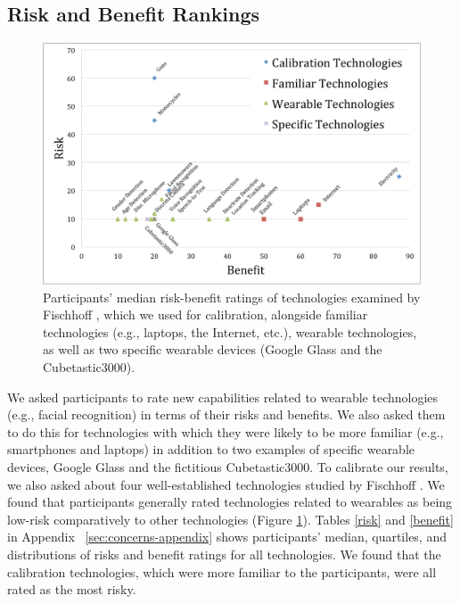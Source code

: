 
\subsection{Risk and Benefit Rankings} 
\begin{figure}[t]
	\centering
	\includegraphics[width=\columnwidth]{images/riskbenefit.pdf}
	\caption{Participants' median risk-benefit ratings of technologies examined by Fischhoff \etal\cite{Fischhoff}, which we used for calibration, alongside familiar technologies (e.g., laptops, the Internet, etc.), wearable technologies, as well as two specific wearable devices (Google Glass and the Cubetastic3000).}
	\label{fig:techplot}
\end{figure}

We asked participants to rate new capabilities related to wearable technologies (e.g., facial recognition) in terms of their risks and benefits. We also asked them to do this for technologies with which they were likely to be more familiar (e.g., smartphones and laptops) in addition to two examples of specific wearable devices, Google Glass and the fictitious Cubetastic3000. To calibrate our results, we also asked about four well-established technologies studied by Fischhoff \etal\cite{Fischhoff}. We found that participants generally rated technologies related to wearables as being low-risk comparatively to other technologies (Figure \ref{fig:techplot}). Tables \ref{risk} and \ref{benefit} in Appendix ~\ref{sec:concerns-appendix} shows participants' median, quartiles, and distributions of risks and benefit ratings for all technologies. We found that the calibration technologies, which were more familiar to the participants, were all rated as the most risky. 

